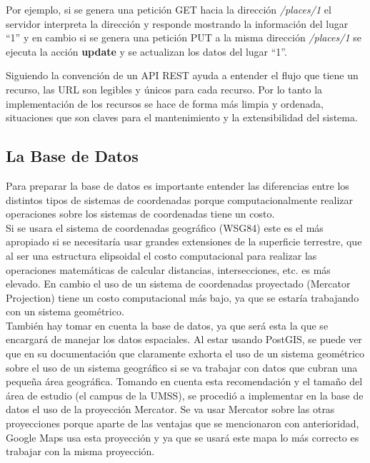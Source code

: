   Por ejemplo, si se genera una petición GET hacia la direcci\'on
  \mbox{\emph{/places/1}}  el servidor interpreta la dirección y responde
  mostrando la información del lugar “1” y en cambio si se genera
  una petición PUT a la misma direcci\'on \emph{/places/1} se ejecuta la acción \textbf{update} y se actualizan los datos del lugar ``1''.


  Siguiendo la convención de un API REST ayuda a entender el flujo que tiene un recurso,
  las URL son legibles y únicos para cada recurso. Por lo tanto la implementación   de los recursos se hace de forma más limpia y ordenada, situaciones que son   claves para el mantenimiento y la extensibilidad del sistema.


\subsection{La Base de Datos}
\label{sub:data_base}

        Para preparar la base de datos es importante entender las diferencias entre los distintos tipos de sistemas de coordenadas porque computacionalmente realizar operaciones sobre los sistemas de coordenadas tiene un costo.\\

       Si se usara el sistema de coordenadas geográfico (WSG84) este es el más apropiado si se necesitaría usar grandes extensiones de la superficie terrestre, que al ser una estructura elipsoidal el costo computacional para realizar las operaciones matemáticas de calcular distancias, intersecciones, etc. es más elevado. En cambio el uso de un sistema de coordenadas proyectado (Mercator Projection) tiene un costo computacional más bajo, ya que se estaría trabajando con un sistema geométrico.\\

       También hay tomar en cuenta la base de datos, ya que será esta la que se encargará de manejar los datos espaciales. Al estar usando PostGIS, se puede ver que en su documentación que claramente exhorta el uso de un sistema geométrico sobre el uso de un sistema geográfico si  se va trabajar con datos que cubran una pequeña área geográfica. Tomando en cuenta esta recomendación y el tamaño del área de estudio (el campus de la UMSS), se procedió a implementar en la base de datos el uso de la proyección Mercator. Se va usar Mercator sobre las otras proyecciones porque aparte de las ventajas que se mencionaron con anterioridad, Google Maps usa esta proyección y ya que se usará este mapa lo más correcto es trabajar con la misma proyección. \\

